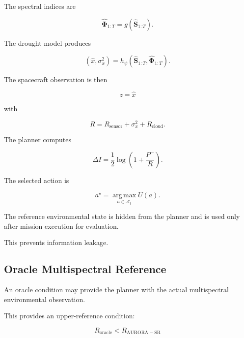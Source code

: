 \documentclass[11pt,a4paper]{article}
\newcommand{\vect}[1]{\bm{#1}}
\newcommand{\argmax}{\operatorname*{arg\,max}}
\begin{document}
The spectral indices are

\begin{equation}
\hat{\vect\Phi}_{1:T}
=
g(
\hat{\vect S}_{1:T}
).
\end{equation}

The drought model produces

\begin{equation}
(\hat x,\sigma_x^2)
=
h_\psi
(
\hat{\vect S}_{1:T},
\hat{\vect\Phi}_{1:T}
).
\end{equation}

The spacecraft observation is then

\begin{equation}
z=\hat x
\end{equation}

with

\begin{equation}
R
=
R_{\mathrm{sensor}}
+
\sigma_x^2
+
R_{\mathrm{cloud}}.
\end{equation}

The planner computes

\begin{equation}
\Delta I
=
\frac12
\log
\left(
1+
\frac{P^-}{R}
\right).
\end{equation}

The selected action is

\begin{equation}
a^\star
=
\argmax_{a\in\mathcal A_t}
U(a).
\end{equation}

The reference environmental state is hidden from the planner and is
used only after mission execution for evaluation.

This prevents information leakage.


\subsection{Oracle Multispectral Reference}

An oracle condition may provide the planner with the actual
multispectral environmental observation.

This provides an upper-reference condition:

\begin{equation}
R_{\mathrm{oracle}}
<
R_{\mathrm{AURORA-SR}}
\end{equation}
\end{document}
